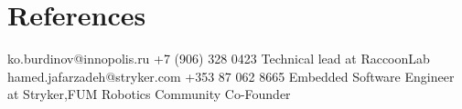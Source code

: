 
\section{References}
    \vspace{3mm}
    {ko.burdinov@innopolis.ru
    \hspace{7mm} +7 (906) 328 0423 }
    {
    Technical lead at RaccoonLab
    }
    \vspace{3mm}
    {hamed.jafarzadeh@stryker.com 
    \hspace{7mm} +353 87 062 8665}
    {Embedded Software Engineer at Stryker,FUM Robotics Community Co-Founder }
    \vspace{3mm}
